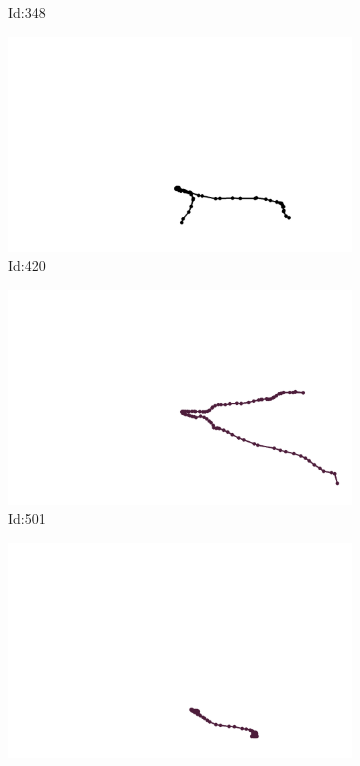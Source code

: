 \documentclass[12pt,twoside]{report}
\begin{document}
\begin{figure}
\begin{subfigure}[b]{0.20\textwidth}
\caption{Id:348}
\end{subfigure}
\begin{subfigure}[b]{0.20\textwidth}
\centering
\includegraphics[width=\textwidth]{../trajectories/420.png}
\caption{Id:420}
\end{subfigure}
\begin{subfigure}[b]{0.20\textwidth}
\centering
\includegraphics[width=\textwidth]{../trajectories/501.png}
\caption{Id:501}
\end{subfigure}
\begin{subfigure}[b]{0.20\textwidth}
\centering
\includegraphics[width=\textwidth]{../trajectories/536.png}

\end{subfigure}
\end{figure}
\end{document}
